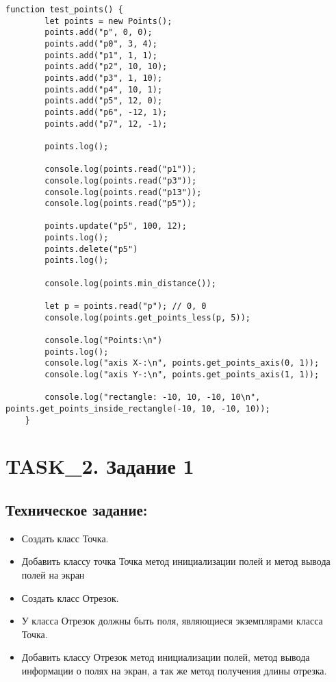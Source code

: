 \begin{lstlisting}[caption=Код тестов. Задание 3.]
	function test_points() {
		let points = new Points();
		points.add("p", 0, 0);
		points.add("p0", 3, 4);
		points.add("p1", 1, 1);
		points.add("p2", 10, 10);
		points.add("p3", 1, 10);
		points.add("p4", 10, 1);
		points.add("p5", 12, 0);
		points.add("p6", -12, 1);
		points.add("p7", 12, -1);
	
		points.log();
	
		console.log(points.read("p1"));
		console.log(points.read("p3"));
		console.log(points.read("p13"));
		console.log(points.read("p5"));
	
		points.update("p5", 100, 12);
		points.log();
		points.delete("p5")
		points.log();
	
		console.log(points.min_distance());
	
		let p = points.read("p"); // 0, 0
		console.log(points.get_points_less(p, 5));
	
		console.log("Points:\n")
		points.log();
		console.log("axis X-:\n", points.get_points_axis(0, 1));
		console.log("axis Y-:\n", points.get_points_axis(1, 1));
	
		console.log("rectangle: -10, 10, -10, 10\n", points.get_points_inside_rectangle(-10, 10, -10, 10));
	}	
\end{lstlisting}

\chapter{TASK\_2. Задание 1}

\section{Техническое задание:}

\begin{itemize}
	\item Создать класс Точка.
	\item Добавить классу точка Точка метод инициализации полей и метод вывода полей на экран
	\item Создать класс Отрезок.
	\item У класса Отрезок должны быть поля, являющиеся экземплярами класса Точка.
	\item Добавить классу Отрезок метод инициализации полей, метод вывода информации о полях на экран, а так же метод получения длины отрезка.
\end{itemize}


